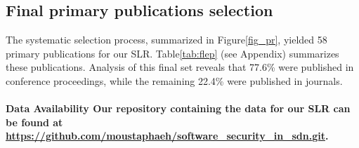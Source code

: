 \subsection{Final primary publications selection}\label{sec:pps}
The systematic selection process, summarized in Figure\ref{fig_pr}, yielded 58 primary publications for our SLR. Table\ref{tab:flep} (see Appendix) summarizes these publications. Analysis of this final set reveals that 77.6\% were published in conference proceedings, while the remaining 22.4\% were published in journals.

\paragraph{\textbf{Data Availability} Our repository containing the data for our SLR can be found at \url{https://github.com/moustaphaeh/software_security_in_sdn.git}.}


